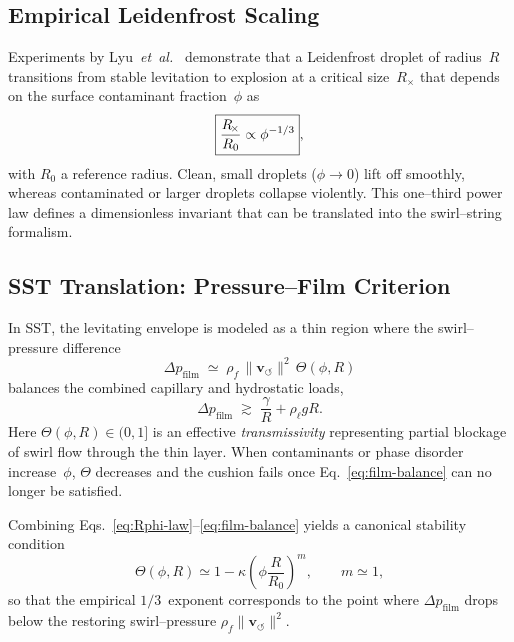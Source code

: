 \documentclass[10pt,reprint,aps,onecolumn,nofootinbib]{revtex4-2}
\begin{document}
    \subsection{Empirical Leidenfrost Scaling}

    Experiments by Lyu~\emph{et~al.}~\cite{Lyu2019LeidenfrostFate}
    demonstrate that a Leidenfrost droplet of radius~$R$ transitions from
    stable levitation to explosion at a critical size~$R_{\!\times}$ that
    depends on the surface contaminant fraction~$\phi$ as
    \begin{equation}
    \boxed{%
    \frac{R_{\!\times}}{R_0} \propto \phi^{-1/3}},
    \label{eq:Rphi-law}
    \end{equation}
    with $R_0$ a reference radius.
    Clean, small droplets ($\phi\!\to\!0$) lift off smoothly, whereas
    contaminated or larger droplets collapse violently.
    This one--third power law defines a dimensionless invariant that can be
    translated into the swirl--string formalism.

    \subsection{SST Translation: Pressure--Film Criterion}

    In SST, the levitating envelope is modeled as a thin region where the
    swirl--pressure difference
    \begin{equation}
    \Delta p_{\mathrm{film}}
    \;\simeq\;
    \rho_{\!f}\,
    \lVert \mathbf{v}_{\!\boldsymbol{\circlearrowleft}}\rVert^{2}\,
    \Theta(\phi,R)
    \label{eq:film-pressure}
    \end{equation}
    balances the combined capillary and hydrostatic loads,
    \begin{equation}
    \Delta p_{\mathrm{film}}
    \;\gtrsim\;
    \frac{\gamma}{R} + \rho_{\ell} g R.
    \label{eq:film-balance}
    \end{equation}
    Here $\Theta(\phi,R)\!\in\!(0,1]$ is an effective \emph{transmissivity}
    representing partial blockage of swirl flow through the thin layer.
    When contaminants or phase disorder increase~$\phi$, $\Theta$ decreases
    and the cushion fails once Eq.~\eqref{eq:film-balance} can no longer be
    satisfied.

    Combining Eqs.~\eqref{eq:Rphi-law}--\eqref{eq:film-balance} yields
    a canonical stability condition
    \begin{equation}
    \Theta(\phi,R)
    \simeq
    1 - \kappa \!\left(
    \phi \frac{R}{R_0}
    \right)^{\!m},
    \qquad
    m\simeq 1,
    \end{equation}
    so that the empirical $1/3$~exponent corresponds to the point where
    $\Delta p_{\mathrm{film}}$ drops below the restoring
    swirl--pressure $\rho_{\!f}\lVert\mathbf{v}_{\!\boldsymbol{\circlearrowleft}}\rVert^{2}$.
\end{document}
